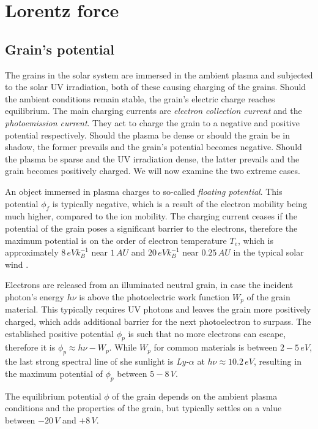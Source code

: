 \section{Lorentz force}

\subsection{Grain's potential}

The grains in the solar system are immersed in the ambient plasma and subjected to the solar UV irradiation, both of these causing charging of the grains. Should the ambient conditions remain stable, the grain's electric charge reaches equilibrium. The main charging currents are \textit{electron collection current} and the \textit{photoemission current}. They act to charge the grain to a negative and positive potential respectively. Should the plasma be dense or should the grain be in shadow, the former prevails and the grain's potential becomes negative. Should the plasma be sparse and the UV irradiation dense, the latter prevails and the grain becomes positively charged. We will now examine the two extreme cases. 

An object immersed in plasma charges to so-called \textit{floating potential}. This potential $\phi_{f}$ is typically negative, which is a result of the electron mobility being much higher, compared to the ion mobility. The charging current ceases if the potential of the grain poses a significant barrier to the electrons, therefore the maximum potential is on the order of electron temperature $T_e$, which is approximately $8 \, \si{eV k_B^{-1}}$ near $1 \, \si{AU}$ and $20 \, \si{eV k_B^{-1}}$ near $0.25 \, \si{AU}$ in the typical solar wind \citep{guillemant2013simulation}. 

Electrons are released from an illuminated neutral grain, in case the incident photon's energy $h\nu$ is above the photoelectric work function $W_{p}$ of the grain material. This typically requires UV photons and leaves the grain more positively charged, which adds additional barrier for the next photoelectron to surpass. The established positive potential $\phi_{p}$ is such that no more electrons can escape, therefore it is $\phi_{p} \approx h\nu - W_{p}$. While $W_p$ for common materials is between $2 - 5 \, \si{eV}$, the last strong spectral line of she sunlight is \textit{Ly-$\alpha$} at $h\nu \approx 10.2 \, \si{eV}$, resulting in the maximum potential of $\phi_p$ between $5 - 8 \, \si{V}$. 

The equilibrium potential $\phi$ of the grain depends on the ambient plasma conditions and the properties of the grain, but typically settles on a value between $-20 \, \si{V}$ and $+8 \, \si{V}$. 

